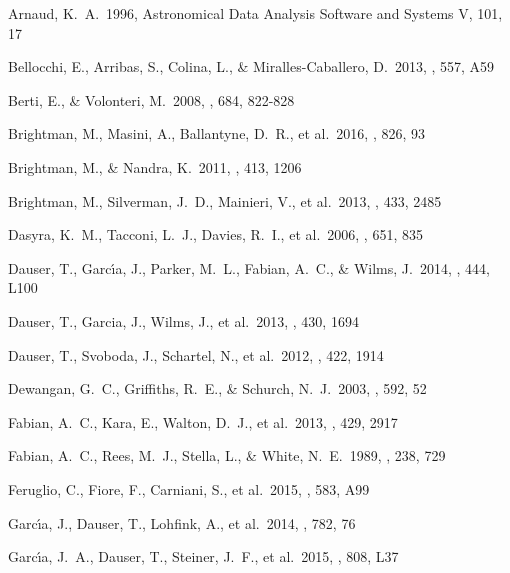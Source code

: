 \documentclass[]{emulateapj}
\begin{document}

\begin{thebibliography}{}

Arnaud, K.~A.\ 1996, Astronomical Data Analysis Software and Systems V, 101, 17 

 Bellocchi, E., Arribas, S., Colina, L., \& Miralles-Caballero, D.\ 2013, \aap, 557, A59 
 
 Berti, E., \& Volonteri, M.\ 2008, \apj, 684, 822-828 

Brightman, M., Masini, A., Ballantyne, D.~R., et al.\ 2016, \apj, 826, 93

Brightman, M., \& Nandra, K.\ 2011, \mnras, 413, 1206 

Brightman, M., Silverman, J.~D., Mainieri, V., et al.\ 2013, \mnras, 433, 2485 

Dasyra, K.~M., Tacconi, L.~J., Davies, R.~I., et al.\ 2006, \apj, 651, 835 

Dauser, T., Garc{\'{\i}}a, J., Parker, M.~L., Fabian, A.~C., \& Wilms, J.\ 2014, \mnras, 444, L100 

Dauser, T., Garcia, J., Wilms, J., et al.\ 2013, \mnras, 430, 1694 

Dauser, T., Svoboda, J., Schartel, N., et al.\ 2012, \mnras, 422, 1914 

Dewangan, G.~C., Griffiths, R.~E., \& Schurch, N.~J.\ 2003, \apj, 592, 52 

Fabian, A.~C., Kara, E., Walton, D.~J., et al.\ 2013, \mnras, 429, 2917

Fabian, A.~C., Rees, M.~J., Stella, L., \& White, N.~E.\ 1989, \mnras, 238, 729  

Feruglio, C., Fiore, F., Carniani, S., et al.\ 2015, \aap, 583, A99 

Garc{\'{\i}}a, J., Dauser, T., Lohfink, A., et al.\ 2014, \apj, 782, 76 

Garc{\'{\i}}a, J.~A., Dauser, T., Steiner, J.~F., et al.\ 2015, \apjl, 808, L37 


\end{thebibliography}
\end{document}
